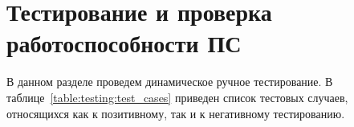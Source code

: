 \section{Тестирование и проверка работоспособности ПС}
\label{sec:testing}

В данном разделе проведем динамическое ручное тестирование. В таблице~\ref{table:testing:test_cases} приведен список тестовых случаев, относящихся как к позитивному, так и к негативному тестированию.

\newcommand\testnumber{\stepcounter{testnumber}\arabic{testnumber}}

\renewcommand{\labelenumi}{\arabic{enumi})}
\renewcommand{\labelenumii}{\asbuk{enumii})}

